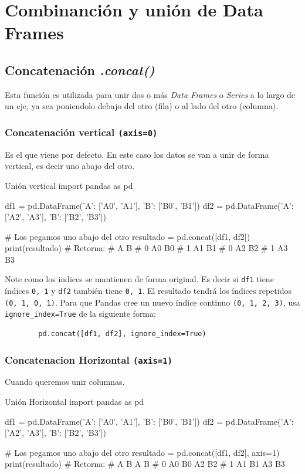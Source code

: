 \section{Combinanción y unión de Data Frames}

\subsection{Concatenación \textit{.concat()}}

Esta función es utilizada para unir dos o más \textit{Data Frames} o \textit{Series} a lo largo de un eje, ya sea poniendolo debajo del otro (fila) o al lado del otro (columna).

\subsubsection{Concatenación vertical \texttt{(axis=0)}}

Es el que viene por defecto. En este caso los datos se van a unir de forma vertical, es decir uno abajo del otro.
\begin{pycode}{Unión vertical}
import pandas as pd

df1 = pd.DataFrame({'A': ['A0', 'A1'], 'B': ['B0', 'B1']})
df2 = pd.DataFrame({'A': ['A2', 'A3'], 'B': ['B2', 'B3']})

# Los pegamos uno abajo del otro
resultado = pd.concat([df1, df2])
print(resultado) # Retorna:
#     A   B
# 0  A0  B0
# 1  A1  B1
# 0  A2  B2
# 1  A3  B3
\end{pycode}

\begin{nota}
    Note como los indices se mantienen de forma original. Es decir si \texttt{df1} tiene índices \texttt{0, 1} y \texttt{df2} también tiene \texttt{0, 1}. El resultado tendrá los índices repetidos \texttt{(0, 1, 0, 1)}. Para que Pandas cree un nuevo índice continuo \texttt{(0, 1, 2, 3)}, usa \texttt{ignore\_index=True} de la siguiente forma:
    \begin{verbatim}
        pd.concat([df1, df2], ignore_index=True)
    \end{verbatim}
\end{nota}

\subsubsection{Concatenacion Horizontal \texttt{(axis=1)}}

Cuando queremos unir columnas.
\begin{pycode}{Unión Horizontal}
import pandas as pd

df1 = pd.DataFrame({'A': ['A0', 'A1'], 'B': ['B0', 'B1']})
df2 = pd.DataFrame({'A': ['A2', 'A3'], 'B': ['B2', 'B3']})

# Los pegamos uno abajo del otro
resultado = pd.concat([df1, df2], axis=1)
print(resultado) # Retorna:
#     A   B   A   B
# 0  A0  B0  A2  B2
# 1  A1  B1  A3  B3
\end{pycode}


